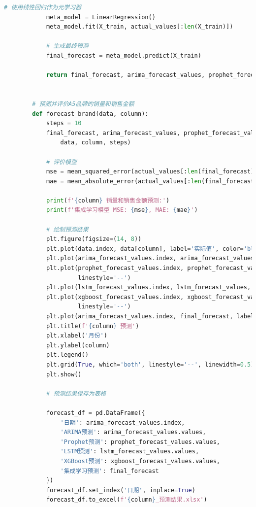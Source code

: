 \documentclass[a4paper]{article}
\begin{document}
\begin{lstlisting}[language=Python]
			# 使用线性回归作为元学习器
			meta_model = LinearRegression()
			meta_model.fit(X_train, actual_values[:len(X_train)])
		
			# 生成最终预测
			final_forecast = meta_model.predict(X_train)
		
			return final_forecast, arima_forecast_values, prophet_forecast_values, lstm_forecast_values, xgboost_forecast_values, actual_values
		
		
		# 预测并评价A5品牌的销量和销售金额
		def forecast_brand(data, column):
			steps = 10
			final_forecast, arima_forecast_values, prophet_forecast_values, lstm_forecast_values, xgboost_forecast_values, actual_values = stacking_forecast(
				data, column, steps)
		
			# 评价模型
			mse = mean_squared_error(actual_values[:len(final_forecast)], final_forecast)
			mae = mean_absolute_error(actual_values[:len(final_forecast)], final_forecast)
		
			print(f'{column} 销量和销售金额预测:')
			print(f'集成学习模型 MSE: {mse}, MAE: {mae}')
		
			# 绘制预测结果
			plt.figure(figsize=(14, 8))
			plt.plot(data.index, data[column], label='实际值', color='blue')
			plt.plot(arima_forecast_values.index, arima_forecast_values, label='ARIMA预测值', color='red', linestyle='--')
			plt.plot(prophet_forecast_values.index, prophet_forecast_values, label='Prophet预测值', color='green',
					 linestyle='--')
			plt.plot(lstm_forecast_values.index, lstm_forecast_values, label='LSTM预测值', color='orange', linestyle='--')
			plt.plot(xgboost_forecast_values.index, xgboost_forecast_values, label='XGBoost预测值', color='cyan',
					 linestyle='--')
			plt.plot(arima_forecast_values.index, final_forecast, label='集成学习预测值', color='purple', linestyle='--')
			plt.title(f'{column} 预测')
			plt.xlabel('月份')
			plt.ylabel(column)
			plt.legend()
			plt.grid(True, which='both', linestyle='--', linewidth=0.5)
			plt.show()
		
			# 预测结果保存为表格
		
			forecast_df = pd.DataFrame({
				'日期': arima_forecast_values.index,
				'ARIMA预测': arima_forecast_values.values,
				'Prophet预测': prophet_forecast_values.values,
				'LSTM预测': lstm_forecast_values.values,
				'XGBoost预测': xgboost_forecast_values.values,
				'集成学习预测': final_forecast
			})
			forecast_df.set_index('日期', inplace=True)
			forecast_df.to_excel(f'{column}_预测结果.xlsx')
		

\end{lstlisting}
\end{document}

